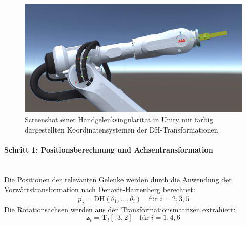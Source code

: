 \begin{figure}[H]
	\centering
	\includegraphics[width=\linewidth]{Figures/wristSingularityScreenshot.jpg}
	\caption{Screenshot einer Handgelenksingularität in Unity mit farbig
		dargestellten Koordinatensystemen der DH-Transformationen}
	\label{figure:wristSingularity}
\end{figure}

\paragraph{Schritt 1: Positionsberechnung und Achsentransformation}~\\
Die Positionen der relevanten Gelenke werden durch die Anwendung der
Vorwärtstransformation nach Denavit-Hartenberg berechnet:
\begin{equation}
	\vec{p}_i = \text{DH}(\theta_1, \ldots, \theta_i) \quad \text{für } i = 2, 3, 5
	\label{eq:position_calculation}
\end{equation}
\noindent
Die Rotationsachsen werden aus den Transformationsmatrizen extrahiert:
\begin{equation}
	\mathbf{z}_i = \mathbf{T}_i[:3, 2] \quad \text{für } i = 1, 4, 6
	\label{eq:axis_extraction}
\end{equation}

